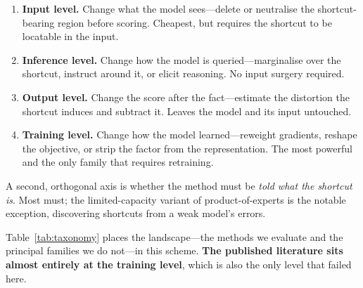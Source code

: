 \documentclass{article}
\begin{document}
\begin{enumerate}
\item \textbf{Input level.} Change what the model sees---delete or neutralise
      the shortcut-bearing region before scoring. Cheapest, but requires the
      shortcut to be locatable in the input.
\item \textbf{Inference level.} Change how the model is queried---marginalise
      over the shortcut, instruct around it, or elicit reasoning. No input
      surgery required.
\item \textbf{Output level.} Change the score after the fact---estimate the
      distortion the shortcut induces and subtract it. Leaves the model and its
      input untouched.
\item \textbf{Training level.} Change how the model learned---reweight
      gradients, reshape the objective, or strip the factor from the
      representation. The most powerful and the only family that requires
      retraining.
\end{enumerate}

A second, orthogonal axis is whether the method must be \emph{told what the
shortcut is}. Most must; the limited-capacity variant of product-of-experts
\citep{sanh2020lmm} is the notable exception, discovering shortcuts from a weak
model's errors.

Table~\ref{tab:taxonomy} places the landscape---the methods we evaluate and the
principal families we do not---in this scheme. \textbf{The published literature
sits almost entirely at the training level}, which is also the only level that
failed here.
\end{document}
